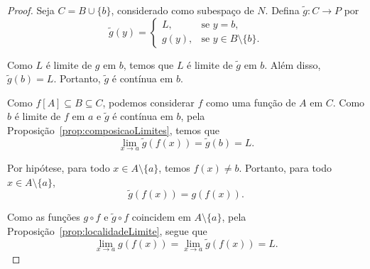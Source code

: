\begin{proof}
    Seja $C=B\cup\{b\}$, considerado como subespaço de $N$.
    Defina $\widetilde g:C\to P$ por
    \[
        \widetilde g(y)=
        \begin{cases}
            L, & \text{se } y=b,\\
            g(y), & \text{se } y\in B\setminus\{b\}.
        \end{cases}
    \]

    Como $L$ é limite de $g$ em $b$, temos que $L$ é limite de $\widetilde g$ em $b$.
    Além disso, $\widetilde g(b)=L$.
    Portanto, $\widetilde g$ é contínua em $b$.

    Como $f[A]\subseteq B\subseteq C$, podemos considerar $f$ como uma função de $A$ em $C$.
    Como $b$ é limite de $f$ em $a$ e $\widetilde g$ é contínua em $b$, pela Proposição~\ref{prop:composicaoLimites}, temos que
    \[
        \lim_{x\to a} \widetilde g(f(x))=\widetilde g(b)=L.
    \]

    Por hipótese, para todo $x\in A\setminus\{a\}$, temos $f(x)\neq b$.
    Portanto, para todo $x\in A\setminus\{a\}$,
    \[
        \widetilde g(f(x))=g(f(x)).
    \]

    Como as funções $g\circ f$ e $\widetilde g\circ f$ coincidem em $A\setminus\{a\}$, pela Proposição~\ref{prop:localidadeLimite}, segue que
    \[
        \lim_{x\to a} g(f(x))=\lim_{x\to a} \widetilde g(f(x))=L.
    \]
\end{proof}

